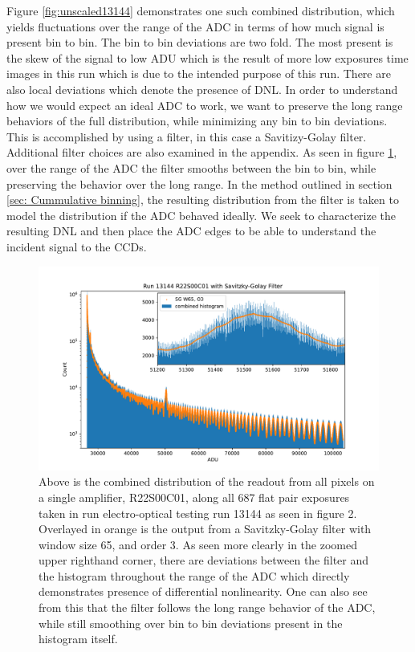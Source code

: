 \documentclass[11pt, letterpaper]{article}
\begin{document}
Figure \ref{fig:unscaled13144} demonstrates one such combined distribution, which yields fluctuations over the range of the ADC in terms of how much signal is present bin to bin. 
The bin to bin deviations are two fold. 
The most present is the skew of the signal to low ADU which is the result of more low exposures time images in this run which is due to the intended purpose of this run. 
There are also local deviations which denote the presence of DNL. 
In order to understand how we would expect an ideal ADC to work, we want to preserve the long range behaviors of the full distribution, while minimizing any bin to bin deviations. 
This is accomplished by using a filter, in this case a Savitizy-Golay filter.
Additional filter choices are also examined in the appendix. 
As seen in figure \ref{fig:filterunscaled13144}, over the range of the ADC the filter smooths between the bin to bin, while preserving the behavior over the long range. 
In the method outlined in section \ref{sec: Cummulative binning}, the resulting distribution from the filter is taken to model the distribution if the ADC behaved ideally. 
We seek to characterize the resulting DNL and then place the ADC edges to be able to understand the incident signal to the CCDs. 

\begin{figure}
    \centering
    \includegraphics[width=0.5\linewidth]{bar2.pdf}
    \caption{Above is the combined distribution of the readout from all pixels on a single amplifier, R22S00C01, along all 687 flat pair exposures taken in run electro-optical testing run 13144 as seen in figure 2. Overlayed in orange is the output from a Savitzky-Golay filter with window size 65, and order 3. As seen more clearly in the zoomed upper righthand corner, there are deviations between the filter and the histogram throughout the range of the ADC which directly demonstrates presence of differential nonlinearity. One can also see from this that the filter follows the long range behavior of the ADC, while still smoothing over bin to bin deviations present in the histogram itself.}
    \label{fig:filterunscaled13144}
\end{figure}
\end{document}
